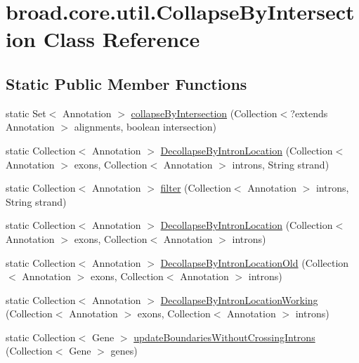 \hypertarget{classbroad_1_1core_1_1util_1_1_collapse_by_intersection}{\section{broad.\+core.\+util.\+Collapse\+By\+Intersection Class Reference}
\label{classbroad_1_1core_1_1util_1_1_collapse_by_intersection}
}
\subsection*{Static Public Member Functions}
\begin{DoxyCompactItemize}
\item 
static Set$<$ Annotation $>$ \hyperlink{classbroad_1_1core_1_1util_1_1_collapse_by_intersection_acca4135dc1d9cafa4a07b0be84b00e67}{collapse\+By\+Intersection} (Collection$<$?extends Annotation $>$ alignments, boolean intersection)
\item 
static Collection$<$ Annotation $>$ \hyperlink{classbroad_1_1core_1_1util_1_1_collapse_by_intersection_a591dc5b6fcf322d9939c9622ab004cd0}{Decollapse\+By\+Intron\+Location} (Collection$<$ Annotation $>$ exons, Collection$<$ Annotation $>$ introns, String strand)
\item 
static Collection$<$ Annotation $>$ \hyperlink{classbroad_1_1core_1_1util_1_1_collapse_by_intersection_a4b443eec558faccf567870a535ab98e7}{filter} (Collection$<$ Annotation $>$ introns, String strand)
\item 
static Collection$<$ Annotation $>$ \hyperlink{classbroad_1_1core_1_1util_1_1_collapse_by_intersection_a2bbd704922af338724d81573e25c601e}{Decollapse\+By\+Intron\+Location} (Collection$<$ Annotation $>$ exons, Collection$<$ Annotation $>$ introns)
\item 
static Collection$<$ Annotation $>$ \hyperlink{classbroad_1_1core_1_1util_1_1_collapse_by_intersection_a26b13b1e360adc09bc5fc35c19830c1c}{Decollapse\+By\+Intron\+Location\+Old} (Collection$<$ Annotation $>$ exons, Collection$<$ Annotation $>$ introns)
\item 
static Collection$<$ Annotation $>$ \hyperlink{classbroad_1_1core_1_1util_1_1_collapse_by_intersection_a666762b918009084be93463151713e3d}{Decollapse\+By\+Intron\+Location\+Working} (Collection$<$ Annotation $>$ exons, Collection$<$ Annotation $>$ introns)
\item 
static Collection$<$ Gene $>$ \hyperlink{classbroad_1_1core_1_1util_1_1_collapse_by_intersection_abc3ad0938d457af44e6f4512896b1030}{update\+Boundaries\+Without\+Crossing\+Introns} (Collection$<$ Gene $>$ genes)

\end{DoxyCompactItemize}
